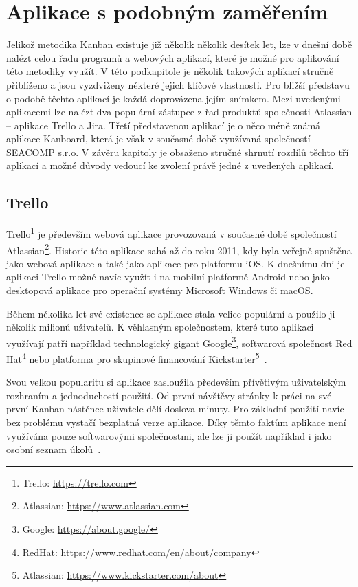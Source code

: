 \section{Aplikace s podobným zaměřením}\label{sec:apps}
Jelikož metodika Kanban existuje již několik několik desítek let, lze v dnešní době nalézt celou řadu programů a webových aplikací, které je možné pro aplikování této metodiky využít. V této podkapitole je několik takových aplikací stručně přiblíženo a jsou vyzdviženy některé jejich klíčové vlastnosti. Pro bližší představu o podobě těchto aplikací je každá doprovázena jejím snímkem. Mezi uvedenými aplikacemi lze nalézt dva populární zástupce z řad produktů společnosti Atlassian -- aplikace Trello a Jira. Třetí představenou aplikací je o něco méně známá aplikace Kanboard, která je však v současné době využívaná společností SEACOMP s.r.o. V závěru kapitoly je obsaženo stručné shrnutí rozdílů těchto tří aplikací a možné důvody vedoucí ke zvolení právě jedné z uvedených aplikací.

\subsection{Trello}
Trello\footnote{Trello: \url{https://trello.com}} je především webová aplikace provozovaná v současné době společností Atlassian\footnote{Atlassian: \url{https://www.atlassian.com}}. Historie této aplikace sahá až do roku 2011, kdy byla veřejně spuštěna jako webová aplikace a také jako aplikace pro platformu iOS. K dnešnímu dni je aplikaci Trello možné navíc využít i na mobilní platformě Android nebo jako desktopová aplikace pro operační systémy Microsoft Windows či macOS. 

Během několika let své existence se aplikace stala velice populární a použilo ji několik milionů uživatelů. K věhlasným společnostem, které tuto aplikaci využívají patří například technologický gigant Google\footnote{Google: \url{https://about.google/}}, softwarová společnost Red Hat\footnote{RedHat: \url{https://www.redhat.com/en/about/company}} nebo platforma pro skupinové financování Kickstarter\footnote{Atlassian: \url{https://www.kickstarter.com/about}}~\cite{bib:trello-about}. 

Svou velkou popularitu si aplikace zasloužila především přívětivým uživatelským rozhraním a jednoduchostí použití. Od první návštěvy stránky k práci na své první Kanban nástěnce uživatele dělí doslova minuty. Pro základní použití navíc bez problému vystačí bezplatná verze aplikace. Díky těmto faktům aplikace není využívána pouze softwarovými společnostmi, ale lze ji použít například i jako osobní seznam úkolů~\cite{bib:jira-vs-trello}.

